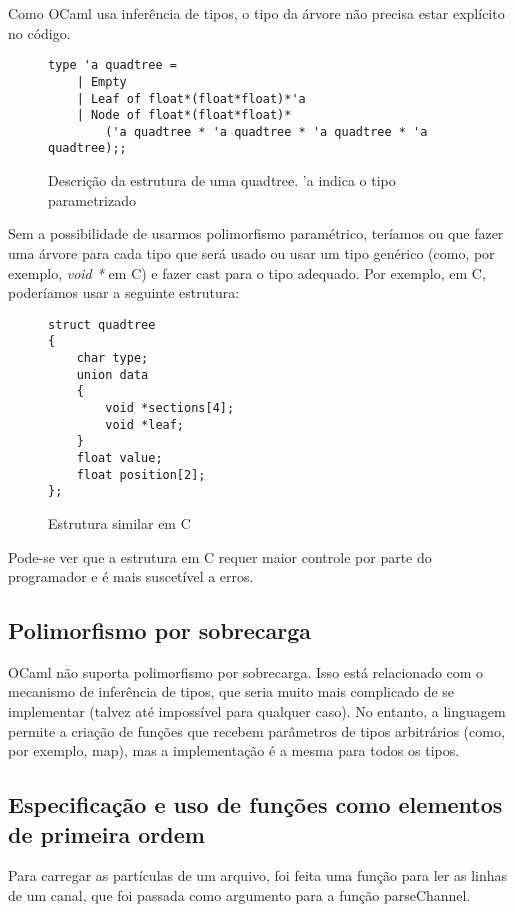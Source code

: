 \documentclass[a4paper,10pt]{article}
\begin{document}
		Como OCaml usa inferência de tipos, o tipo da árvore não precisa estar explícito no código.
		
	\begin{figure}[H]
	\centering	
	\begin{lstlisting}
type 'a quadtree =
	| Empty
	| Leaf of float*(float*float)*'a
	| Node of float*(float*float)*
		('a quadtree * 'a quadtree * 'a quadtree * 'a quadtree);;
	\end{lstlisting}
	\caption{Descrição da estrutura de uma quadtree. 'a indica o tipo parametrizado }
	\end{figure}
	
	Sem a possibilidade de usarmos polimorfismo paramétrico, teríamos ou que fazer uma árvore para cada tipo que será usado ou usar um tipo genérico (como, por exemplo, \textit{void *} em C) e fazer cast para o tipo adequado. Por exemplo, em C, poderíamos usar a seguinte estrutura:

	\begin{figure}[H]
	\centering	
	\begin{lstlisting}
struct quadtree
{
	char type;
	union data
	{
		void *sections[4];
		void *leaf;
	}	
	float value;
	float position[2];	
};
	\end{lstlisting}
	\caption{Estrutura similar em C }
	\end{figure}
	
	Pode-se ver que a estrutura em C requer maior controle por parte do programador e é mais suscetível a erros.
	
\subsection{Polimorfismo por sobrecarga}
	
	OCaml não suporta polimorfismo por sobrecarga. Isso está relacionado com o mecanismo de inferência de tipos, que seria muito mais complicado de se implementar (talvez até impossível para qualquer caso). No entanto, a linguagem permite a criação de funções que recebem parâmetros de tipos arbitrários (como, por exemplo, map), mas a implementação é a mesma para todos os tipos.

\subsection{Especificação e uso de funções como elementos de primeira ordem}
	\label{ElementosPrimeiraOrdem}
	Para carregar as partículas de um arquivo, foi feita uma função para ler as linhas de um canal, que foi passada como argumento para a função parseChannel.
	
\end{document}
